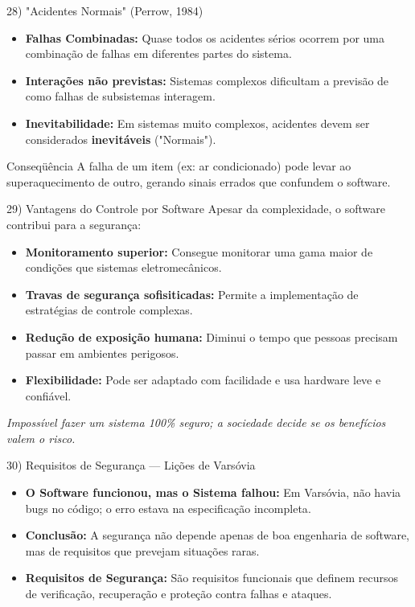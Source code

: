 \documentclass[aspectratio=169]{beamer}
\begin{document}
\begin{frame}{28) "Acidentes Normais" (Perrow, 1984)}
  \begin{itemize}
    \item \textbf{Falhas Combinadas:} Quase todos os acidentes sérios ocorrem por uma combinação de falhas em diferentes partes do sistema.
    \item \textbf{Interações não previstas:} Sistemas complexos dificultam a previsão de como falhas de subsistemas interagem.
    \item \textbf{Inevitabilidade:} Em sistemas muito complexos, acidentes devem ser considerados \textbf{inevitáveis} ("Normais").
  \end{itemize}
  \vspace{0.3em}
  \begin{alertblock}{Conseqüência}
    A falha de um item (ex: ar condicionado) pode levar ao superaquecimento de outro, gerando sinais errados que confundem o software.
  \end{alertblock}
\end{frame}

\begin{frame}{29) Vantagens do Controle por Software}
  Apesar da complexidade, o software contribui para a segurança:
  \begin{itemize}
    \item \textbf{Monitoramento superior:} Consegue monitorar uma gama maior de condições que sistemas eletromecânicos.
    \item \textbf{Travas de segurança sofisiticadas:} Permite a implementação de estratégias de controle complexas.
    \item \textbf{Redução de exposição humana:} Diminui o tempo que pessoas precisam passar em ambientes perigosos.
    \item \textbf{Flexibilidade:} Pode ser adaptado com facilidade e usa hardware leve e confiável.
  \end{itemize}
  \vspace{0.3em}
  \textit{Impossível fazer um sistema 100\% seguro; a sociedade decide se os benefícios valem o risco.}
\end{frame}

\begin{frame}{30) Requisitos de Segurança — Lições de Varsóvia}
  \begin{itemize}
    \item \textbf{O Software funcionou, mas o Sistema falhou:} Em Varsóvia, não havia bugs no código; o erro estava na \alert{especificação incompleta}.
    \item \textbf{Conclusão:} A segurança não depende apenas de boa engenharia de software, mas de requisitos que prevejam situações raras.
    \item \textbf{Requisitos de Segurança:} São requisitos funcionais que definem recursos de verificação, recuperação e proteção contra falhas e ataques.
  \end{itemize}
\end{frame}
\end{document}
